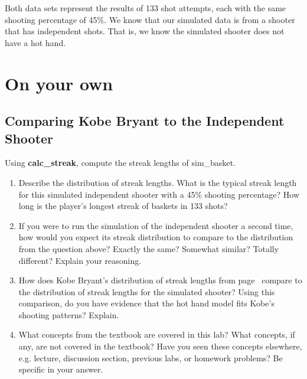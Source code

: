 \documentclass{article}\usepackage[]{graphicx}\usepackage[]{color}
\newcommand{\hlstd}[1]{\textcolor[rgb]{0.345,0.345,0.345}{#1}}%
\newcommand{\hlkwd}[1]{\textcolor[rgb]{0.737,0.353,0.396}{\textbf{#1}}}%
\begin{document}
Both data sets represent the results of 133 shot attempts, each with the same shooting percentage of 45\%. We know that our simulated data is from a shooter that has independent shots. That is, we know the simulated shooter does not have a hot hand.

\vspace{2cm}

%

\section*{On your own}
\subsection*{Comparing Kobe Bryant to the Independent Shooter}
Using \hlkwd{calc\_streak}, compute the streak lengths of \hlstd{sim\_basket}.

\begin{enumerate}
\item Describe the distribution of streak lengths. What is the typical streak length for this simulated independent shooter with a 45\% shooting percentage? How long is the player's longest streak of baskets in 133 shots?

\item If you were to run the simulation of the independent shooter a second time, how would you expect its streak distribution to compare to the distribution from the question above? Exactly the same? Somewhat similar? Totally different? Explain your reasoning.

\item How does Kobe Bryant's distribution of streak lengths from page~\pageref{kobeStreak} compare to the distribution of streak lengths for the simulated shooter? Using this comparison, do you have evidence that the hot hand model fits Kobe's shooting patterns? Explain.

\item What concepts from the textbook are covered in this lab? What concepts, if any, are not covered in the textbook? Have you seen these concepts elsewhere, e.g. lecture, discussion section, previous labs, or homework problems? Be specific in your answer.
\end{enumerate}
\end{document}
